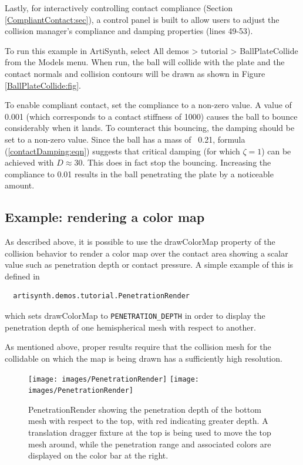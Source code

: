 Lastly, for interactively controlling contact compliance
(Section \ref{CompliantContact:sec}), a control panel is built to
allow users to adjust the collision manager's {\sf compliance} and
{\sf damping} properties (lines 49-53).

To run this example in ArtiSynth, select {\sf All demos > tutorial >
BallPlateCollide} from the {\sf Models} menu. When run, the ball
will collide with the plate and the contact normals and collision 
contours will be drawn as shown in Figure \ref{BallPlateCollide:fig}.

To enable compliant contact, set the {\sf compliance} to a
non-zero value. A value of 0.001 (which corresponds to a contact
stiffness of 1000) causes the ball to bounce considerably when it
lands. To counteract this bouncing, the {\sf damping} should be set to
a non-zero value. Since the ball has a mass of ~0.21, formula
(\ref{contactDamping:eqn}) suggests that critical damping (for which
$\zeta=1$) can be achieved with $D \approx 30$. This does in fact stop
the bouncing. Increasing the compliance to 0.01 results in the ball
penetrating the plate by a noticeable amount.

\subsection{Example: rendering a color map}
\label{renderingDepth:sec}

As described above, it is possible to use the {\sf drawColorMap}
property of the collision behavior to render a color map over the
contact area showing a scalar value such as penetration depth or
contact pressure. A simple example of this is defined in
%
\begin{verbatim}
  artisynth.demos.tutorial.PenetrationRender
\end{verbatim}
%
which sets {\sf drawColorMap} to {\tt PENETRATION\_DEPTH} in order to
display the penetration depth of one hemispherical mesh with respect
to another. 

\begin{sideblock}
As mentioned above, proper results require that the collision mesh for
the collidable on which the map is being drawn has a sufficiently high
resolution.
\end{sideblock}

\begin{figure}[ht]
\begin{center}
\iflatexml
 \texttt{[image: images/PenetrationRender]}
\else
 \texttt{[image: images/PenetrationRender]}
\fi
\end{center}
\caption{PenetrationRender showing the penetration depth of the bottom
mesh with respect to the top, with red indicating greater depth.
A translation dragger fixture at the top is being used to 
move the top mesh around, while the penetration range and
associated colors are displayed on the color bar at the right.}
\label{PenetrationRender:fig}
\end{figure}

